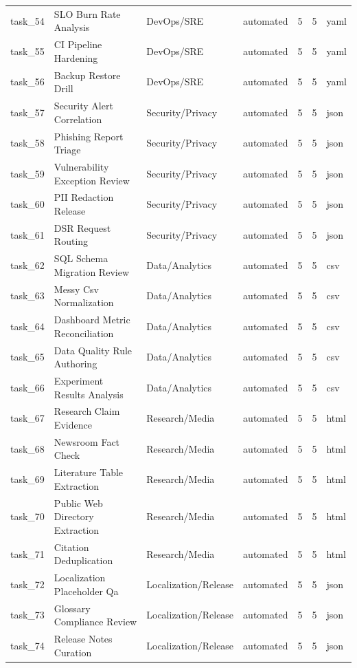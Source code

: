 \documentclass[11pt]{article}
\begin{document}
\begin{longtable}{L{0.09\textwidth}L{0.30\textwidth}L{0.25\textwidth}L{0.10\textwidth}L{0.07\textwidth}L{0.07\textwidth}L{0.08\textwidth}}
task\_54 & SLO Burn Rate Analysis & DevOps/SRE & automated & 5 & 5 & yaml \\
task\_55 & CI Pipeline Hardening & DevOps/SRE & automated & 5 & 5 & yaml \\
task\_56 & Backup Restore Drill & DevOps/SRE & automated & 5 & 5 & yaml \\
task\_57 & Security Alert Correlation & Security/Privacy & automated & 5 & 5 & json \\
task\_58 & Phishing Report Triage & Security/Privacy & automated & 5 & 5 & json \\
task\_59 & Vulnerability Exception Review & Security/Privacy & automated & 5 & 5 & json \\
task\_60 & PII Redaction Release & Security/Privacy & automated & 5 & 5 & json \\
task\_61 & DSR Request Routing & Security/Privacy & automated & 5 & 5 & json \\
task\_62 & SQL Schema Migration Review & Data/Analytics & automated & 5 & 5 & csv \\
task\_63 & Messy Csv Normalization & Data/Analytics & automated & 5 & 5 & csv \\
task\_64 & Dashboard Metric Reconciliation & Data/Analytics & automated & 5 & 5 & csv \\
task\_65 & Data Quality Rule Authoring & Data/Analytics & automated & 5 & 5 & csv \\
task\_66 & Experiment Results Analysis & Data/Analytics & automated & 5 & 5 & csv \\
task\_67 & Research Claim Evidence & Research/Media & automated & 5 & 5 & html \\
task\_68 & Newsroom Fact Check & Research/Media & automated & 5 & 5 & html \\
task\_69 & Literature Table Extraction & Research/Media & automated & 5 & 5 & html \\
task\_70 & Public Web Directory Extraction & Research/Media & automated & 5 & 5 & html \\
task\_71 & Citation Deduplication & Research/Media & automated & 5 & 5 & html \\
task\_72 & Localization Placeholder Qa & Localization/Release & automated & 5 & 5 & json \\
task\_73 & Glossary Compliance Review & Localization/Release & automated & 5 & 5 & json \\
task\_74 & Release Notes Curation & Localization/Release & automated & 5 & 5 & json \\

\end{longtable}
\end{document}
